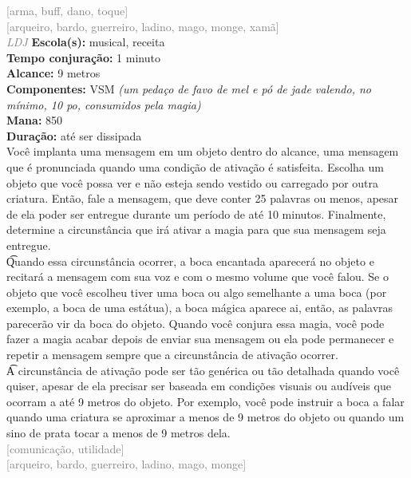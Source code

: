 \documentclass{RPG_Adventure}[2021/10/20]
\begin{document}
{\scriptsize \textcolor{gray}{[arma, buff, dano, toque]\\}}
{\scriptsize \textcolor{gray}{[arqueiro, bardo, guerreiro, ladino, mago, monge, xamã]\\}}
{\tiny \textcolor{gray}{\textit{LDJ}}}\jump{}
{\small \t \textbf{Escola(s):} musical, receita\\\t \textbf{Tempo conjuração:} 1 minuto\\\t \textbf{Alcance:} 9 metros\\\t \textbf{Componentes:} VSM \textit{(um pedaço de favo de mel e pó de jade valendo, no mínimo, 10 po, consumidos pela magia)}\\\t \textbf{Mana:} 850\\\t \textbf{Duração:} até ser dissipada\\}
{\normalsize Você implanta uma mensagem em um objeto dentro do alcance, uma mensagem que é pronunciada quando uma condição de ativação é satisfeita. Escolha um objeto que você possa ver e não esteja sendo vestido ou carregado por outra criatura. Então, fale a mensagem, que deve conter 25 palavras ou menos, apesar de ela poder ser entregue durante um período de até 10 minutos. Finalmente, determine a circunstância que irá ativar a magia para que sua mensagem seja entregue.\\\t Quando essa circunstância ocorrer, a boca encantada aparecerá no objeto e recitará a mensagem com sua voz e com o mesmo volume que você falou. Se o objeto que você escolheu tiver uma boca ou algo semelhante a uma boca (por exemplo, a boca de uma estátua), a boca mágica aparece ai, então, as palavras parecerão vir da boca do objeto. Quando você conjura essa magia, você pode fazer a magia acabar depois de enviar sua mensagem ou ela pode permanecer e repetir a mensagem sempre que a circunstância de ativação ocorrer.\\\t A circunstância de ativação pode ser tão genérica ou tão detalhada quando você quiser, apesar de ela precisar ser baseada em condições visuais ou audíveis que ocorram a até 9 metros do objeto. Por exemplo, você pode instruir a boca a falar quando uma criatura se aproximar a menos de 9 metros do objeto ou quando um sino de prata tocar a menos de 9 metros dela.\\}
{\scriptsize \textcolor{gray}{[comunicação, utilidade]\\}}
{\scriptsize \textcolor{gray}{[arqueiro, bardo, guerreiro, ladino, mago, monge]\\}}
\end{document}
